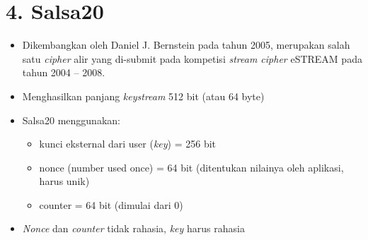 \documentclass{article}
\begin{document}

\section*{4. Salsa20}

\begin{itemize}
    \item Dikembangkan oleh Daniel J. Bernstein pada tahun 2005, merupakan salah satu \textit{cipher} alir yang di-submit pada kompetisi \textit{stream cipher} eSTREAM pada tahun 2004 -- 2008.
    \item Menghasilkan panjang \textit{keystream} 512 bit (atau 64 byte)
    \item Salsa20 menggunakan:
    \begin{itemize}
        \item kunci eksternal dari user (\textit{key}) = 256 bit
        \item nonce (number used once) = 64 bit (ditentukan nilainya oleh aplikasi, harus unik)
        \item counter = 64 bit (dimulai dari 0)
    \end{itemize}
    \item \textit{Nonce} dan \textit{counter} tidak rahasia, \textit{key} harus rahasia
\end{itemize}
\end{document}

